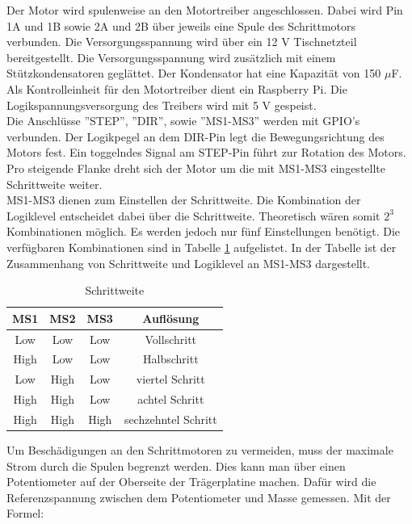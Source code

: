 Der Motor wird spulenweise an den Motortreiber angeschlossen. Dabei wird Pin 1A und 1B sowie 2A und 2B über jeweils eine Spule des Schrittmotors verbunden.
Die Versorgungsspannung wird über ein 12 V Tischnetzteil bereitgestellt. Die Versorgungsspannung wird zusätzlich mit einem Stützkondensatoren geglättet. Der Kondensator hat eine Kapazität von 150 $\mu$F.
Als Kontrolleinheit für den Motortreiber dient ein Raspberry Pi. Die Logikspannungsversorgung des Treibers wird mit 5 V gespeist.\\ 
Die Anschlüsse ''STEP'', ''DIR'', sowie ''MS1-MS3'' werden mit \ac{GPIO}’s verbunden. Der Logikpegel an dem DIR-Pin legt die Bewegungsrichtung des Motors fest. Ein toggelndes Signal am STEP-Pin führt zur Rotation des Motors. Pro steigende Flanke dreht sich der Motor um die mit MS1-MS3 eingestellte Schrittweite weiter. \\  
MS1-MS3 dienen zum Einstellen der Schrittweite. Die Kombination der Logiklevel entscheidet dabei über die Schrittweite. Theoretisch wären somit $2^{3}$ Kombinationen möglich. Es werden jedoch nur fünf Einstellungen benötigt. Die verfügbaren Kombinationen sind in Tabelle \ref{Mikrostepping} aufgelistet. In der Tabelle ist der Zusammenhang von Schrittweite und Logiklevel an MS1-MS3 dargestellt. 


\begin{table}
	\centering
	\caption{Schrittweite}
	\begin{tabular} [H] {|c|c|c|c|}
		\hline
		\textbf{MS1} & \textbf{MS2}	& \textbf{MS3} 		& \textbf{Auflösung} \\ \hline
		Low & Low	& Low		& Vollschritt\\ \hline
		High & Low 	& Low  		& Halbschritt	\\ \hline
		Low & High  & Low 		& viertel Schritt 	\\ \hline
		High & High	& Low 		& achtel Schritt 	\\ \hline
		High & High	 &  High	& sechzehntel Schritt	\\\hline
	
	\end {tabular}
	\label{Mikrostepping}
\end{table}



Um Beschädigungen an den Schrittmotoren zu vermeiden, muss der maximale Strom durch die Spulen begrenzt werden. Dies kann man über einen Potentiometer auf der Oberseite der Trägerplatine machen. Dafür wird die Referenzspannung zwischen dem Potentiometer und Masse gemessen. Mit der Formel: 

